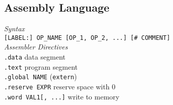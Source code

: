 \subsection*{Assembly Language}
\emph{Syntax}\\
\texttt{[LABEL:] OP\_NAME [OP\_1, OP\_2, ...] [\# COMMENT]}\\
\emph{Assembler Directives}\\
\texttt{.data} \hfill data segment\\
\texttt{.text} \hfill program segment\\
\texttt{.global NAME} \hfill (\texttt{extern})\\
\texttt{.reserve EXPR} \hfill reserve space with 0\\
\texttt{.word VAL1[, ...]} \hfill write to memory\\